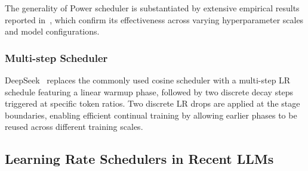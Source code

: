 The generality of Power scheduler is substantiated by extensive empirical results reported in~\cite{shen2024power}, which confirm its effectiveness across varying hyperparameter scales and model configurations.


\subsubsection{Multi-step Scheduler}
DeepSeek~\cite{bi2024deepseek} replaces the commonly used cosine scheduler with a multi-step LR schedule featuring a linear warmup phase, followed by two discrete decay steps triggered at specific token ratios. Two discrete LR drops are applied at the stage boundaries, enabling efficient continual training by allowing earlier phases to be reused across different training scales.




\subsection{Learning Rate Schedulers in Recent LLMs}

